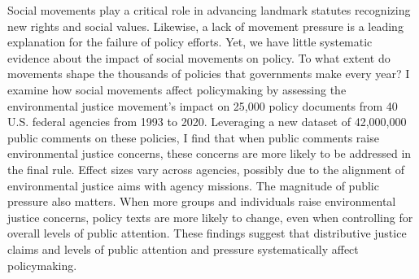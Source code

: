 Social movements play a critical role in advancing landmark statutes recognizing new rights and social values. Likewise, a lack of movement pressure is a leading explanation for the failure of policy efforts. Yet, we have little systematic evidence about the impact of social movements on policy. To what extent do movements shape the thousands of policies that governments make every year? I examine how social movements affect policymaking by assessing the environmental justice movement's impact on 25,000 policy documents from 40 U.S. federal agencies from 1993 to 2020.  Leveraging a new dataset of 42,000,000 public comments on these policies, I find that when public comments raise environmental justice concerns, these concerns are more likely to be addressed in the final rule. Effect sizes vary across agencies, possibly due to the alignment of environmental justice aims with agency missions.
The magnitude of public pressure also matters. When more groups and individuals raise environmental justice concerns, policy texts are more likely to change, even when controlling for overall levels of public attention. These findings suggest that distributive justice claims and levels of public attention and pressure systematically affect policymaking. 